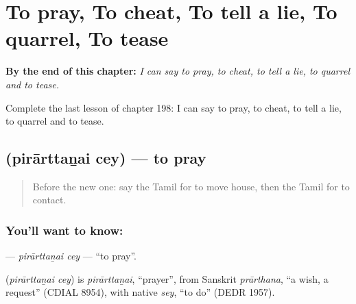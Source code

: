 
\chapter{To pray, To cheat, To tell a lie, To quarrel, To tease}
\label{ch:ta-to-pray-to-cheat-to-tell-a-lie-to-quarrel-to-tease}

\begin{chapteropening}
\textbf{By the end of this chapter:} \emph{I can say to pray, to cheat, to tell a lie, to quarrel and to tease.}

Complete the last lesson of chapter 198: I can say to pray, to cheat, to tell a lie, to quarrel and to tease.
\end{chapteropening}

\section[\texorpdfstring{\ta{பிரார்த்தனை} \ta{செய்} (pirārttaṉai cey)}{பிரார்த்தனை செய் (pirārttaṉai cey)}]{  (pirārttaṉai cey) — to pray}

\label{lesson:TA-C198-pirarttanai-cey}



\begin{quote}
Before the new one: say the Tamil for to move house, then the Tamil for to contact.
\end{quote}

\subsection*{You'll want to know:  }
\textbf{ } — \emph{pirārttaṉai cey} — \textquotedblleft{}to pray\textquotedblright{}.

\begin{cousinweb}
\textbf{ } (\emph{pirārttaṉai cey}) is \emph{pirārttaṉai}, \textquotedblleft{}prayer\textquotedblright{}, from Sanskrit \emph{prārthana}, \textquotedblleft{}a wish, a request\textquotedblright{} (CDIAL 8954), with native \emph{sey}, \textquotedblleft{}to do\textquotedblright{} (DEDR 1957).
\end{cousinweb}

